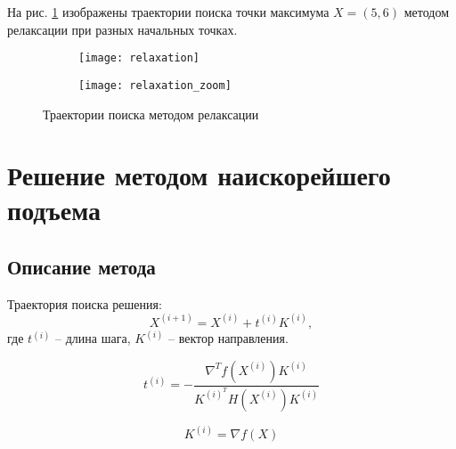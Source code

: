 На рис. \ref{fig:relaxation} изображены траектории поиска точки максимума $X = (5, 6)$ методом релаксации при разных начальных точках.
\begin{figure}[H]
\begin{center}
	\begin{subfigure}[b]{0.49\textwidth}
		\texttt{[image: relaxation]}
	\end{subfigure}
	\begin{subfigure}[b]{0.49\textwidth}
		\texttt{[image: relaxation\_zoom]}
	\end{subfigure}
	\caption{Траектории поиска методом релаксации}
	\label{fig:relaxation}
\end{center}
\end{figure}

\section{Решение методом наискорейшего подъема}

\subsection{Описание метода}

Траектория поиска решения:
\begin{equation*}
X^{(i+1)}  = X^{(i)} + t^{(i)} K^{(i)},
\end{equation*}
где $t^{(i)}$ -- длина шага, $K^{(i)}$ -- вектор направления.

\begin{equation*}
t^{(i)} = -\dfrac{\nabla^T f\left(X^{(i)}\right) K^{(i)}}{K^{(i)^T} H\left(X^{(i)}\right) K^{(i)}}
\end{equation*}

\begin{equation*}
K^{(i)} = \nabla f(X)
\end{equation*}

%
%
%
%
%

